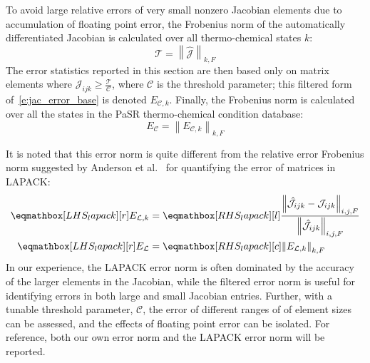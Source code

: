 \documentclass[12pt,number,sort&compress,preprint]{elsarticle}
\begin{document}
To avoid large relative errors of very small nonzero Jacobian elements due to accumulation of floating point error, the Frobenius norm of the automatically differentiated Jacobian is calculated over all thermo-chemical states $k$:
\begin{equation}
 \label{e:thresh}
 \mathcal{T} = \left\lVert \mathcal{\hat{J}} \right\rVert_{k, F}
\end{equation}
The error statistics reported in this section are then based only on matrix elements where $\mathcal{J}_{ijk} \ge \frac{\mathcal{T}}{\mathcal{C}}$, where $\mathcal{C}$ is the threshold parameter; this filtered form of~\cref{e:jac_error_base} is denoted $E_{\mathcal{C},k}$.
Finally, the Frobenius norm is calculated over all the states in the PaSR thermo-chemical condition database:
\begin{equation}
 \label{e:thresholded_error}
 E_{\mathcal{C}} = \left\lVert E_{\mathcal{C},k} \right\rVert_{k, F}
\end{equation}

It is noted that this error norm is quite different from the relative error Frobenius norm suggested by Anderson et al.~\cite{Anderson:1999aa} for quantifying the error of matrices in LAPACK:
\begin{align}
 \label{e:error_lapack}
 \lhs{lapack}{E_{\mathcal{L}, k}} &=  \rhs{lapack}{\frac{\left\lVert \hat{\mathcal{J}}_{ijk} - \mathcal{J}_{ijk} \right\rVert_{i,j,F}}{\left\lVert \hat{\mathcal{J}}_{ijk} \right\rVert_{i,j,F}}} \nonumber \\
 \lhs{lapack}{E_{\mathcal{L}}} &= \rhs{lapack}{\left\lVert  E_{\mathcal{L}, k} \right\rVert_{k, F}}[c]
\end{align}
In our experience, the LAPACK error norm is often dominated by the accuracy of the larger elements in the Jacobian, while the filtered error norm is useful for identifying errors in both large and small Jacobian entries.
Further, with a tunable threshold parameter, $\mathcal{C}$, the error of different ranges of of element sizes can be assessed, and the effects of floating point error can be isolated.
For reference, both our own error norm and the LAPACK error norm will be reported.
\end{document}
